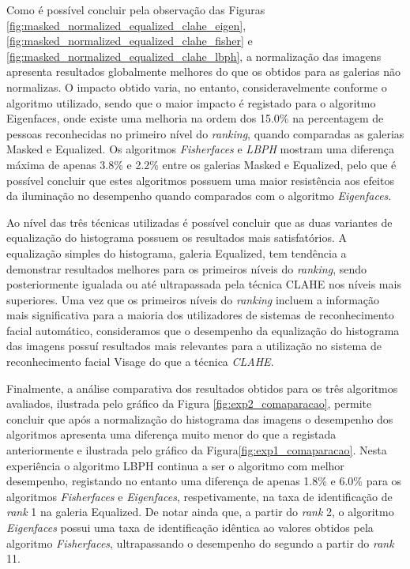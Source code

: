 Como é possível concluir pela observação das Figuras \ref{fig:masked_normalized_equalized_clahe_eigen}, \ref{fig:masked_normalized_equalized_clahe_fisher} e \ref{fig:masked_normalized_equalized_clahe_lbph}, a normalização das imagens apresenta resultados globalmente melhores do que os obtidos para as galerias não normalizas. O impacto obtido varia, no entanto, consideravelmente conforme o algoritmo utilizado, sendo que o maior impacto é registado para o algoritmo Eigenfaces, onde existe uma melhoria na ordem dos 15.0\% na percentagem de pessoas reconhecidas no primeiro nível do \textit{ranking}, quando comparadas as galerias Masked e Equalized. Os algoritmos \textit{Fisherfaces} e \textit{LBPH} mostram uma diferença máxima de apenas 3.8\% e 2.2\% entre os galerias Masked e Equalized, pelo que é possível concluir que estes algoritmos possuem uma maior resistência aos efeitos da iluminação no desempenho quando comparados com o algoritmo \textit{Eigenfaces}.

Ao nível das três técnicas utilizadas é possível concluir que as duas variantes de equalização do histograma possuem os resultados mais satisfatórios. A equalização simples do histograma, galeria Equalized, tem tendência a demonstrar resultados melhores para os primeiros níveis do \textit{ranking}, sendo posteriormente igualada ou até ultrapassada pela técnica CLAHE nos níveis mais superiores. Uma vez que os primeiros níveis do \textit{ranking} incluem a informação mais significativa para a maioria dos utilizadores de sistemas de reconhecimento facial automático, consideramos que o desempenho da equalização do histograma das imagens possuí resultados mais relevantes para a utilização no sistema de reconhecimento facial Visage do que a técnica \textit{CLAHE}.

Finalmente, a análise comparativa dos resultados obtidos para os três algoritmos avaliados, ilustrada pelo gráfico da Figura \ref{fig:exp2_comaparacao}, permite concluir que após a normalização do histograma das imagens o desempenho dos algoritmos apresenta uma diferença muito menor do que a registada anteriormente e ilustrada pelo gráfico da Figura\ref{fig:exp1_comaparacao}. Nesta experiência o algoritmo LBPH continua a ser o algoritmo com melhor desempenho, registando no entanto uma diferença de apenas 1.8\% e 6.0\% para os algoritmos \textit{Fisherfaces} e \textit{Eigenfaces}, respetivamente, na taxa de identificação de \textit{rank} 1 na galeria Equalized. De notar ainda que, a partir do \textit{rank} 2, o algoritmo  \textit{Eigenfaces} possui uma taxa de identificação idêntica ao valores obtidos pela algoritmo \textit{Fisherfaces}, ultrapassando o desempenho do segundo a partir do \textit{rank} 11.

